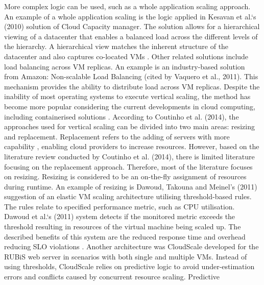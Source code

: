 More complex logic can be used, such as a whole application scaling
approach. An example of a whole application scaling is the logic applied in Kesavan et al.`s (2010) solution of Cloud Capacity
manager. The solution allows for a hierarchical viewing of a datacenter
that enables a balanced load across the different levels of the
hierarchy. A hierarchical view matches the inherent structure
of the datacenter and also captures co-located VMs \cite{kesavan2013ccm}. Other related
solutions include load balancing across VM replicas. An example is an
industry-based solution from Amazon: Non-scalable Load Balancing (cited
by Vaquero et al., 2011). This mechanism provides the
ability to distribute load across VM replicas.
\newline\newline
Despite the inability of most operating systems to execute vertical
scaling, the method has become more popular considering the current
developments in cloud computing, including containerised solutions \cite{paladi2018towards}. According to Coutinho et al. (2014), the
approaches used for vertical scaling can be divided into two main areas:
resizing and replacement. Replacement refers to the adding of servers
with more capability \cite{patros2016resource}, enabling cloud providers to increase resources. However, based on the literature
review conducted by Coutinho et al. (2014), there is limited literature
focusing on the replacement approach. Therefore, most of the literature focuses on resizing. 
\newline\newline
Resizing is considered to be an on-the-fly assignment of resources
during runtime. An example of resizing is Dawoud, Takouna and Meinel's
(2011) suggestion of an elastic VM scaling architecture utilising
threshold-based rules. The rules relate to specified performance metric, such as CPU utilisation. Dawoud et al.`s (2011) system detects if
the monitored metric exceeds the threshold resulting in resources of the
virtual machine being scaled up. The described benefits of this system
are the reduced response time and overhead reducing SLO
violations \cite{dawoud2011elastic}.
\newline\newline
Another architecture was CloudScale \cite{shen2011cloudscale}
developed for the RUBiS web server in scenarios with both single and multiple VMs. Instead of using thresholds, CloudScale relies on
predictive logic to avoid under-estimation
errors and conflicts caused by concurrent resource scaling. Predictive
